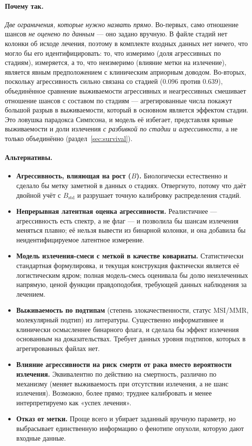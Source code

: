 \documentclass[12pt,a4paper]{article}
\newcommand{\why}[1]{\paragraph{Почему так.} #1}
\newcommand{\alt}[1]{\paragraph{Альтернативы.} #1}
\begin{document}
\why{\emph{Две ограничения, которые нужно назвать прямо.}
Во-первых, само отношение шансов \emph{не оценено по данным} --- оно задано вручную. В файле стадий нет
колонки об исходе лечения, поэтому в комплекте входных данных нет ничего, что могло бы его
идентифицировать: то, что измеримо (доля агрессивных по стадиям), измеряется, а то, что неизмеримо (влияние
метки на излечение), является явным предположением с клиническим априорным доводом.
Во-вторых, поскольку агрессивность сильно связана со стадией ($0.096$ против $0.639$), объединённое
сравнение выживаемости агрессивных и неагрессивных смешивает отношение шансов с составом по стадиям ---
агрегированные числа покажут большой разрыв в выживаемости, который в основном является эффектом стадии.
Это ловушка парадокса Симпсона, и модель её избегает, представляя кривые выживаемости и доли излечения
\emph{с разбивкой по стадии и агрессивности}, а не только объединённо (раздел~\ref{sec:survival}).}

\alt{\begin{itemize}[nosep]
  \item \textbf{Агрессивность, влияющая на рост ($B$).} Биологически естественно и сделало бы метку
        заметной в данных о стадиях. Отвергнуто, потому что даёт двойной учёт с $B_{\text{std}}$ и
        разрушает точную калибровку распределения стадий.
  \item \textbf{Непрерывная латентная оценка агрессивности.} Реалистичнее --- агрессивность есть спектр, а не
        флаг --- и позволила бы шансам излечения меняться плавно; её нельзя вывести из бинарной колонки, и
        она добавила бы неидентифицируемое латентное измерение.
  \item \textbf{Модель излечения-смеси с меткой в качестве ковариаты.} Статистически стандартная
        формулировка, и текущая конструкция фактически является её логистическим ядром; полная модель-смесь
        оценивала бы долю неизлеченных напрямую, ценой функции правдоподобия, требующей данных наблюдения за
        лечением.
  \item \textbf{Выживаемость по подтипам} (степень злокачественности, статус MSI/MMR, молекулярный подтип)
        из литературы. Существенно информативнее и клинически осмысленнее бинарного флага, и сделала бы
        эффект излечения основанным на доказательствах. Требует данных уровня подтипов, которых в
        агрегированных файлах нет.
  \item \textbf{Влияние агрессивности на риск смерти от рака вместо вероятности излечения.} Эквивалентно по
        действию на смертность, различно по механизму (меняет выживаемость при отсутствии излечения, а не
        шанс излечения). Возможно, более прямо; труднее калибровать и менее интерпретируемо как «успех
        лечения».
  \item \textbf{Отказ от метки.} Проще всего и убирает заданный вручную параметр, но выбрасывает
        единственную информацию о фенотипе опухоли, которую дают входные данные.
\end{itemize}}
\end{document}

